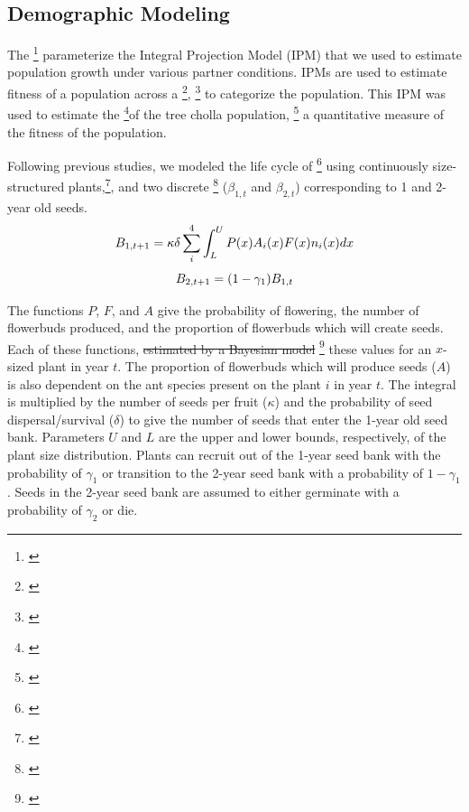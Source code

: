 \documentclass[12pt,a4paper]{article}
\newcommand{\tom}[2]{{\color{red}{#1}}\footnote{\textit{\color{red}{#2}}}}
\begin{document}
		\subsection*{Demographic Modeling}
		
		The \tom{statistical models described above}{they are actually below - but i would put them above.} parameterize the Integral Projection Model (IPM) that we used to estimate population growth under various partner conditions.  
		IPMs are used to estimate fitness of a population across a \tom{continuous variable}{you actually have both continuous and discrete variables}, \tom{rather than using a stage- or size-specific variable}{not an accurate description of how IPMs differ from MPMs} to categorize the population. 
		This IPM was used to estimate the \tom{growth rate }{not just growth rate, but growthrate as a function of partner identity and diversity -- important to include}of the tree cholla population, \tom{effectively}{why effectively?} a quantitative measure of the fitness of the population. 
		
		Following previous studies, we modeled the life cycle of \tom{\textit{C. imbricata}}{sometimes you say cholla, sometimes cacti, sometimes the latin name -- stay consistent} using continuously size-structured plants,\tom{$n_i(x)$}{what is n? what is i? what is x?}, and two discrete \tom{seed banks}{there is no beta in the model below. what is t?} ($\beta_{1,t}$ and $\beta_{2,t}$) corresponding to 1 and 2-year old seeds.
		$$
		B_{1, t+1} = \kappa \delta \sum_{i}^{4} \int_L^U P(x) A_i(x) F(x)n_i(x) dx \\
		$$
		$$
		B_{2,t+1} =  (1 - \gamma_1)B_{1,t}\\
		$$
		
		The functions $P$, $F$, and $A$ give the probability of flowering, the number of flowerbuds produced, and the proportion of flowerbuds which will create seeds. 
		Each of these functions, \st{estimated by a Bayesian model} \tom{calculates}{the function does not do any calculation} these values for an $x$-sized plant in year $t$. 
		The proportion of flowerbuds which will produce seeds ($A$) is also dependent on the ant species present on the plant $i$ in year $t$. 
		The integral is multiplied by the number of seeds per fruit ($\kappa$) and the probability of seed dispersal/survival ($\delta$) to give the number of seeds that enter the 1-year old seed bank. 
		Parameters $U$ and $L$ are the upper and lower bounds, respectively, of the plant size distribution. 
		Plants can recruit out of the 1-year seed bank with the probability of $\gamma_1$ or transition to the 2-year seed bank with a probability of $1 - \gamma_1$. 
		Seeds in the 2-year seed bank are assumed to either germinate with a probability of $\gamma_2$ or die. 
		
\end{document}
